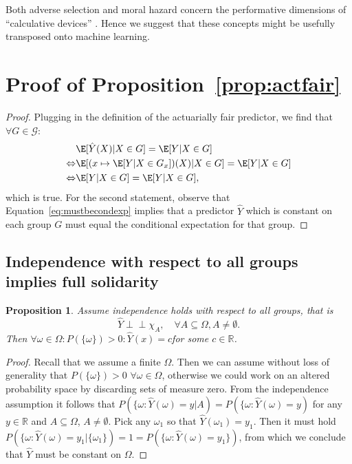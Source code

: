 \documentclass[11pt]{article} %
\newcommand{\indep}{\perp \!\!\! \perp}
\newtheorem{proposition}[theorem]{Proposition}
\begin{document}

Both adverse selection and moral hazard concern the performative dimensions of ``calculative devices'' \citep{van2014politics}. Hence we suggest that these concepts might be usefully transposed onto machine learning.



\section{Proof of Proposition~\ref{prop:actfair}}
\label{app:actfairproof}
\begin{proof}
   
Plugging in the definition of the actuarially fair predictor, we find that $\forall G \in \mathcal{G}$:
        \begin{align}
        \label{eq:mustbecondexp}
        &\E[\hat{Y}(X)|X \in G]=\E[Y|X \in G]\\
\Leftrightarrow  &\E[(x \mapsto \E[Y|X \in G_x])(X)|X \in G]=\E[Y|X \in G]\\
\Leftrightarrow &\E[Y|X \in G] = \E[Y|X \in G],
\end{align}
which is true. For the second statement, observe that Equation~\ref{eq:mustbecondexp} implies that a predictor $\hat{Y}$ which is constant on each group $G$ must equal the conditional expectation for that group.
\end{proof}

\subsection{Independence with respect to all groups implies full solidarity}
\label{app:solidarityproof}
\begin{proposition}
    Assume independence holds with respect to all groups, that is
    \[
    \hat{Y} \indep \chi_A, \quad \forall A \subseteq \Omega, A \neq \emptyset.
    \]
    Then $\forall \omega \in \Omega : P(\{\omega\})>0 : \hat{Y}(x)=c $\thinspace for some $c \in \mathbb{R}$.
\end{proposition}
\begin{proof}
    Recall that we assume a finite $\Omega$. Then we can assume without loss of generality that $P(\{\omega\})>0$ $\forall \omega \in \Omega$, otherwise we could work on an altered probability space by discarding sets of measure zero. From the independence assumption it follows that $P(\{\omega \colon \hat{Y}(\omega) = y | A)=P(\{\omega \colon \hat{Y}(\omega)=y)$ for any $y \in \mathbb{R}$ and $A \subseteq \Omega$, $A \neq \emptyset$. Pick any $\omega_1$ so that $\hat{Y}(\omega_1)=y_1$. Then it must hold $P(\{\omega \colon \hat{Y}(\omega)=y_1|\{\omega_1\}) = 1 = P(\{\omega \colon \hat{Y}(\omega)=y_1\})$, from which we conclude that $\hat{Y}$ must be constant on $\Omega$.
\end{proof}
\end{document}
